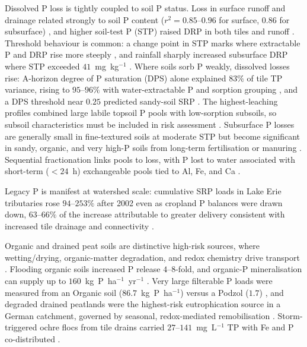 Dissolved P loss is tightly coupled to soil P status. Loss in surface runoff
and drainage related strongly to soil P content
($r^2 = 0.85$--$0.96$ for surface, $0.86$ for subsurface)
\parencite{Sharpley1995}, and higher soil-test P (STP) raised DRP in both
tiles and runoff \parencite{Osterholz2020}. Threshold behaviour is common: a
change point in STP marks where extractable P and DRP rise more steeply
\parencite{McDowell2001b}, and rainfall sharply increased subsurface DRP
where STP exceeded $41$~mg~kg$^{-1}$ \parencite{Ni2020}. Where soils sorb P
weakly, dissolved losses rise: A-horizon degree of P saturation (DPS) alone
explained $83\%$ of tile TP variance, rising to $95$--$96\%$ with
water-extractable P and sorption grouping \parencite{Beauchemin2003}, and a
DPS threshold near $0.25$ predicted sandy-soil SRP \parencite{Siemens2004}.
The highest-leaching profiles combined large labile topsoil P pools with
low-sorption subsoils, so subsoil characteristics must be included in risk
assessment \parencite{Liu2024b}. Subsurface P losses are generally small in
fine-textured soils at moderate STP but become significant in sandy,
organic, and very high-P soils from long-term fertilisation or manuring
\parencite{Sims1998}. Sequential fractionation links pools to loss, with P
lost to water associated with short-term ($<24$~h) exchangeable pools tied to
Al, Fe, and Ca \parencite{McDowell2001}.

Legacy P is manifest at watershed scale: cumulative SRP loads in Lake Erie
tributaries rose $94$--$253\%$ after 2002 even as cropland P balances were
drawn down, $63$--$66\%$ of the increase attributable to greater delivery
consistent with increased tile drainage and connectivity
\parencite{Jarvie2017}.

Organic and drained peat soils are distinctive high-risk sources, where
wetting/drying, organic-matter degradation, and redox chemistry drive
transport \parencite{Grenon2021}. Flooding organic soils increased P release
$4$--$8$-fold, and organic-P mineralisation can supply up to
$160$~kg~P~ha$^{-1}$~yr$^{-1}$ \parencite{Sharpley1995}. Very large filterable
P loads were measured from an Organic soil ($86.7$~kg~P~ha$^{-1}$) versus a
Podzol ($1.7$) \parencite{McDowell2015b}, and degraded drained peatlands were
the highest-risk eutrophication source in a German catchment, governed by
seasonal, redox-mediated remobilisation \parencite{Tiemeyer2009,YliHalla2022}.
Storm-triggered ochre flocs from tile drains carried $27$--$141$~mg~L$^{-1}$
TP with Fe and P co-distributed \parencite{Zimmer2016}.

